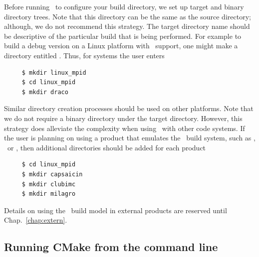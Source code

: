 Before running \cmake\ to configure your build directory, we set up target and binary directory trees.  Note
that this directory can be the same as the source directory; although,
we do not recommend this strategy.  The target directory name should
be descriptive of the particular build that is being performed.  For
example to build a debug version on a Linux platform with \mpi\ support, one might make
a directory entitled . Thus, for  systems the user enters
\begin{verbatim}
     $ mkdir linux_mpid
     $ cd linux_mpid
     $ mkdir draco
\end{verbatim} %
Similar directory creation processes should be used on other platforms.  Note that we do not require a  binary directory under the target
directory.  However, this strategy does alleviate the complexity when
using \draco\ with other code systems.  If the user is planning on
using a product that emulates the \draco\ build system, such as
\capsaicin, \clubimc\  or \milagro, then additional directories should be
added for each product
\begin{verbatim}
     $ cd linux_mpid
     $ mkdir capsaicin
     $ mkdir clubimc
     $ mkdir milagro
\end{verbatim}
Details on using the \draco\ build model in external products are
reserved until Chap.~\ref{chap:extern}.

\subsection{Running CMake from the command line}
\label{sec:running_configure_cmd_line}

